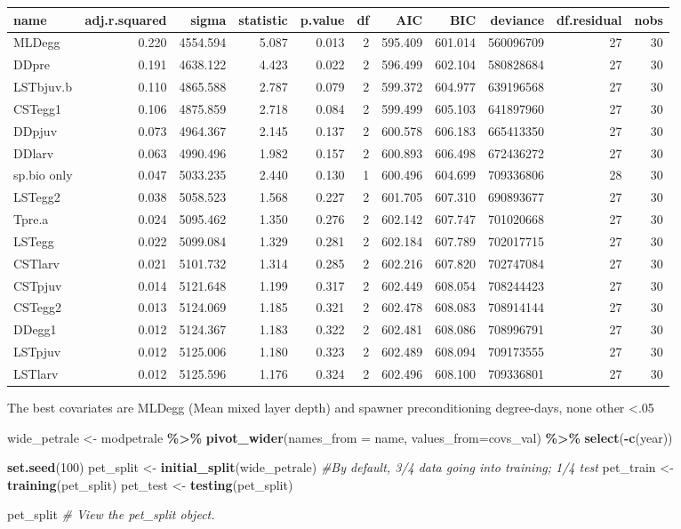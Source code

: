 \documentclass[
]{article}
\newenvironment{Shaded}{\begin{snugshade}}{\end{snugshade}}
\newcommand{\CommentTok}[1]{\textcolor[rgb]{0.56,0.35,0.01}{\textit{#1}}}
\newcommand{\DataTypeTok}[1]{\textcolor[rgb]{0.13,0.29,0.53}{#1}}
\newcommand{\DecValTok}[1]{\textcolor[rgb]{0.00,0.00,0.81}{#1}}
\newcommand{\KeywordTok}[1]{\textcolor[rgb]{0.13,0.29,0.53}{\textbf{#1}}}
\newcommand{\NormalTok}[1]{#1}
\newcommand{\OperatorTok}[1]{\textcolor[rgb]{0.81,0.36,0.00}{\textbf{#1}}}
\newcommand{\StringTok}[1]{\textcolor[rgb]{0.31,0.60,0.02}{#1}}
\begin{document}
\begin{longtable}[]{@{}lrrrrrrrrrr@{}}
\toprule
name & adj.r.squared & sigma & statistic & p.value & df & AIC & BIC &
deviance & df.residual & nobs\tabularnewline
\midrule
\endhead
MLDegg & 0.220 & 4554.594 & 5.087 & 0.013 & 2 & 595.409 & 601.014 &
560096709 & 27 & 30\tabularnewline
DDpre & 0.191 & 4638.122 & 4.423 & 0.022 & 2 & 596.499 & 602.104 &
580828684 & 27 & 30\tabularnewline
LSTbjuv.b & 0.110 & 4865.588 & 2.787 & 0.079 & 2 & 599.372 & 604.977 &
639196568 & 27 & 30\tabularnewline
CSTegg1 & 0.106 & 4875.859 & 2.718 & 0.084 & 2 & 599.499 & 605.103 &
641897960 & 27 & 30\tabularnewline
DDpjuv & 0.073 & 4964.367 & 2.145 & 0.137 & 2 & 600.578 & 606.183 &
665413350 & 27 & 30\tabularnewline
DDlarv & 0.063 & 4990.496 & 1.982 & 0.157 & 2 & 600.893 & 606.498 &
672436272 & 27 & 30\tabularnewline
sp.bio only & 0.047 & 5033.235 & 2.440 & 0.130 & 1 & 600.496 & 604.699 &
709336806 & 28 & 30\tabularnewline
LSTegg2 & 0.038 & 5058.523 & 1.568 & 0.227 & 2 & 601.705 & 607.310 &
690893677 & 27 & 30\tabularnewline
Tpre.a & 0.024 & 5095.462 & 1.350 & 0.276 & 2 & 602.142 & 607.747 &
701020668 & 27 & 30\tabularnewline
LSTegg & 0.022 & 5099.084 & 1.329 & 0.281 & 2 & 602.184 & 607.789 &
702017715 & 27 & 30\tabularnewline
CSTlarv & 0.021 & 5101.732 & 1.314 & 0.285 & 2 & 602.216 & 607.820 &
702747084 & 27 & 30\tabularnewline
CSTpjuv & 0.014 & 5121.648 & 1.199 & 0.317 & 2 & 602.449 & 608.054 &
708244423 & 27 & 30\tabularnewline
CSTegg2 & 0.013 & 5124.069 & 1.185 & 0.321 & 2 & 602.478 & 608.083 &
708914144 & 27 & 30\tabularnewline
DDegg1 & 0.012 & 5124.367 & 1.183 & 0.322 & 2 & 602.481 & 608.086 &
708996791 & 27 & 30\tabularnewline
LSTpjuv & 0.012 & 5125.006 & 1.180 & 0.323 & 2 & 602.489 & 608.094 &
709173555 & 27 & 30\tabularnewline
LSTlarv & 0.012 & 5125.596 & 1.176 & 0.324 & 2 & 602.496 & 608.100 &
709336801 & 27 & 30\tabularnewline
\bottomrule
\end{longtable}

The best covariates are MLDegg (Mean mixed layer depth) and spawner
preconditioning degree-days, none other \textless.05

\begin{Shaded}
\begin{Highlighting}[]
\NormalTok{wide\_petrale <{-}}\StringTok{ }\NormalTok{modpetrale }\OperatorTok{\%>\%}
\StringTok{  }\KeywordTok{pivot\_wider}\NormalTok{(}\DataTypeTok{names\_from =}\NormalTok{ name, }\DataTypeTok{values\_from=}\NormalTok{covs\_val) }\OperatorTok{\%>\%}
\StringTok{  }\KeywordTok{select}\NormalTok{(}\OperatorTok{{-}}\KeywordTok{c}\NormalTok{(year))}

\KeywordTok{set.seed}\NormalTok{(}\DecValTok{100}\NormalTok{)}
\NormalTok{pet\_split <{-}}\StringTok{ }\KeywordTok{initial\_split}\NormalTok{(wide\_petrale) }\CommentTok{\#By default, 3/4 data going into training; 1/4 test}
\NormalTok{pet\_train <{-}}\StringTok{ }\KeywordTok{training}\NormalTok{(pet\_split)}
\NormalTok{pet\_test <{-}}\StringTok{ }\KeywordTok{testing}\NormalTok{(pet\_split)}

\NormalTok{pet\_split }\CommentTok{\# View the pet\_split object.}
\end{Highlighting}
\end{Shaded}
\end{document}
